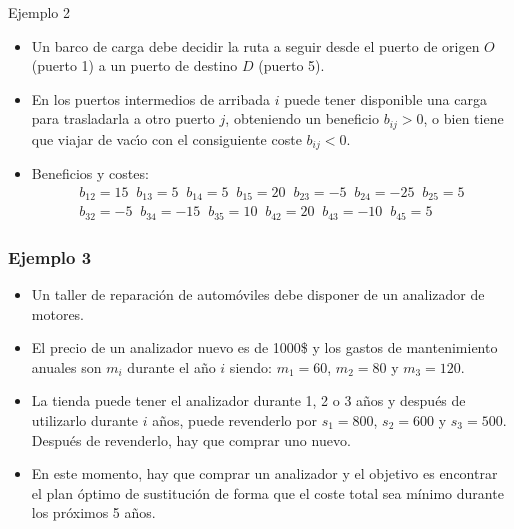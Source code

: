 \documentclass[aspectratio=169]{beamer}
\begin{document}
\begin{frame}{Ejemplo 2}

		\begin{itemize}\itemsep 3mm
			\item Un barco de carga debe decidir la ruta a seguir desde el puerto de origen $O$ (puerto 1) a un puerto de destino $D$ (puerto 5).
			\item En los puertos intermedios  de arribada $i$ puede tener disponible una carga para 	trasladarla a otro puerto $j$, obteniendo un beneficio $b_{ij}>0$, o bien tiene que viajar de vac\'{\i}o con el consiguiente coste $b_{ij}<0$.
  \item Beneficios y costes:
  $$
  \begin{array}{c}
  b_{12}=15 \;\; b_{13}=5 \;\; b_{14}=5 \;\;  b_{15}=20 \;\; b_{23}=-5 \;\; b_{24}=-25 \;\; b_{25}=5
  \\
  b_{32}=-5 \;\; b_{34}=-15 \;\; b_{35}=10 \;\; b_{42}=20 \;\; b_{43}=-10 \;\; b_{45}=5
	\end{array}
$$
		\end{itemize}	


\end{frame}

\begin{frame}

 \frametitle{Ejemplo 3}

\begin{itemize}\itemsep 3mm
\item
Un taller de reparación de automóviles debe disponer de un analizador de motores.
\item
El precio de un analizador nuevo es de 1000\$ y los gastos de mantenimiento anuales son $m_i$ durante el año $i$ siendo: $m_1=60$, $m_2=80$ y $m_3=120$.
\item
La tienda puede tener el analizador durante 1, 2 o 3 años y después de utilizarlo durante $i$ años, puede revenderlo por $s_1=800$, $s_2=600$ y $s_3=500$. Después de revenderlo, hay que comprar uno nuevo.
\item
En este momento, hay que comprar un analizador y el objetivo es encontrar el plan óptimo de sustitución de forma que el coste total sea mínimo durante los próximos 5 años.
 \end{itemize}

\end{frame}
\end{document}
